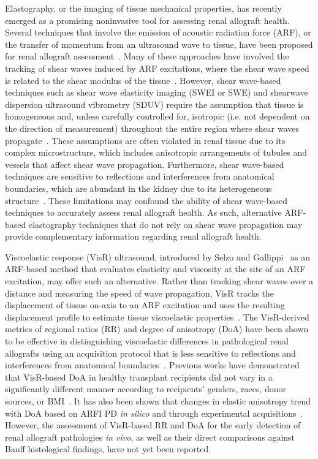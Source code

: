 Elastography, or the imaging of tissue mechanical properties, has recently emerged as a promising noninvasive tool for assessing renal allograft health. Several techniques that involve the emission of acoustic radiation force (ARF), or the transfer of momentum from an ultrasound wave to tissue, have been proposed for renal allograft assessment~\cite{urban_Novel_2021}. Many of these approaches have involved the tracking of shear waves induced by ARF excitations, where the shear wave speed is related to the shear modulus of the tissue~\cite{urban_Novel_2021,filipov_Investigating_2024}. However, shear wave-based techniques such as shear wave elasticity imaging (SWEI or SWE) and shearwave dispersion ultrasound vibrometry (SDUV) require the assumption that tissue is homogeneous and, unless carefully controlled for, isotropic (i.e. not dependent on the direction of measurement) throughout the entire region where shear waves propagate~\cite{sarvazyan_Shear_1998,ngo_plane_2024,andrade_Simultaneous_2025}. These assumptions are often violated in renal tissue due to its complex microstructure, which includes anisotropic arrangements of tubules and vessels that affect shear wave propagation. Furthermore, shear wave-based techniques are sensitive to reflections and interferences from anatomical boundaries, which are abundant in the kidney due to its heterogeneous structure~\cite{urban_Novel_2021}. These limitations may confound the ability of shear wave-based techniques to accurately assess renal allograft health. As such, alternative ARF-based elastography techniques that do not rely on shear wave propagation may provide complementary information regarding renal allograft health.

Viscoelastic response (VisR) ultrasound, introduced by Selzo and Gallippi~\cite{selzo_Viscoelastic_2013} as an ARF-based method that evaluates elasticity and viscosity at the site of an ARF excitation, may offer such an alternative. Rather than tracking shear waves over a distance and measuring the speed of wave propagation, VisR tracks the displacement of tissue on-axis to an ARF excitation and uses the resulting displacement profile to estimate tissue viscoelastic properties~\cite{hossain_Viscoelastic_2020}. The VisR-derived metrics of regional ratios (RR) and degree of anisotropy (DoA) have been shown to be effective in distinguishing viscoelastic differences in pathological renal allografts using an acquisition protocol that is less sensitive to reflections and interferences from anatomical boundaries~\cite{hossain_Evaluating_2018,hossain_Quantitative_2022}. Previous works have demonstrated that VisR-based DoA in healthy transplant recipients did not vary in a significantly different manner according to recipients' genders, races, donor sources, or BMI~\cite{hossain_Mechanical_2019}. It has also been shown that changes in elastic anisotropy trend with DoA based on ARFI PD \emph{in silico} and through experimental acquisitions~\cite{hossain_Viscoelastic_2020,hossain_Quantitative_2022}. However, the assessment of VisR-based RR and DoA for the early detection of renal allograft pathologies \emph{in vivo}, as well as their direct comparisons against Banff histological findings, have not yet been reported.

